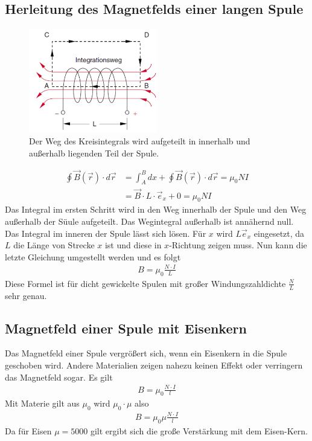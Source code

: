 \documentclass{scrartcl}
\begin{document}
\subsection*{Herleitung des Magnetfelds einer langen Spule}
\begin{figure}[H]
    \centering
    \includegraphics[width=0.5\textwidth]{Magnetfeld Spule Herleitung.png}
    \caption{Der Weg des Kreisintegrals wird aufgeteilt in innerhalb und außerhalb liegenden Teil der Spule.}
\end{figure}
\begin{align}
    \oint \vec{B}(\vec{r}) \cdot d\vec{r} &= \int_{A}^{B} dx + \oint \vec{B}(\vec{r}) \cdot d\vec{r} = \mu_0 N I \label{153}\\
    &= \vec{B} \cdot L \cdot \vec{e}_x + 0 = \mu_0 N I\label{154}
\end{align}
Das Integral im ersten Schritt wird in den Weg innerhalb der Spule und den Weg außerhalb der Süule aufgeteilt. Das Wegintegral außerhalb ist annähernd null.
Das Integral im inneren der Spule lässt sich lösen. Für $x$ wird $L\vec{e}_x$ eingesetzt, da $L$ die Länge von Strecke $x$ ist und diese in $x$-Richtung zeigen muss.
Nun kann die letzte Gleichung umgestellt werden und es folgt 
\begin{align}
    B=\mu_0\frac{N\cdot I}{L}
\end{align}
Diese Formel ist für dicht gewickelte Spulen mit großer Windungszahldichte $\frac{N}{L}$ sehr genau.

\subsection{Magnetfeld einer Spule mit Eisenkern}
Das Magnetfeld einer Spule vergrößert sich, wenn ein Eisenkern in die Spule geschoben wird.
Andere Materialien zeigen nahezu keinen Effekt oder verringern das Magnetfeld sogar.
Es gilt \begin{align}
    B=\mu_0\frac{N\cdot I}{l}
\end{align}
Mit Materie gilt aus $\mu_0$ wird $\mu_0\cdot \mu$ also 
\begin{align}
    B=\mu_0\mu\frac{N\cdot I}{l}
\end{align}
Da für Eisen $\mu=5000$ gilt ergibt sich die große Verstärkung mit dem Eisen-Kern.

\end{document}
